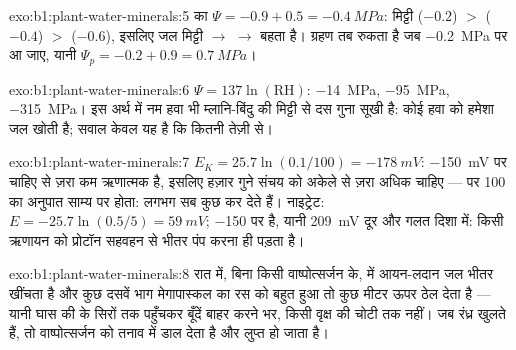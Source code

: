 \begin{solution}{exo:b1:plant-water-minerals:5}
 का $\Psi = -0.9 + 0.5 = \qty{-0.4}{MPa}$: मिट्टी ($-0.2$) $>$ 
($-0.4$) $>$  ($-0.6$), इसलिए जल मिट्टी $\to$  $\to$
 बहता है। ग्रहण तब रुकता है जब  \qty{-0.2}{MPa} पर आ जाए, यानी
$\Psi_p = -0.2 + 0.9 = \qty{0.7}{MPa}$।
\end{solution}

\begin{solution}{exo:b1:plant-water-minerals:6}
$\Psi = 137\ln(\text{RH})$: \qty{-14}{MPa}, \qty{-95}{MPa},
\qty{-315}{MPa}। इस अर्थ में नम हवा भी म्लानि-बिंदु की मिट्टी से दस गुना
सूखी है: कोई  हवा को हमेशा जल खोती है; सवाल केवल यह है कि
कितनी तेज़ी से।
\end{solution}

\begin{solution}{exo:b1:plant-water-minerals:7}
$E_K = 25.7\ln(0.1/100) = \qty{-178}{mV}$: \qty{-150}{mV} पर 
चाहिए से ज़रा कम ऋणात्मक है, इसलिए हज़ार गुने संचय को
अकेले  से ज़रा अधिक चाहिए --- पर 100 का अनुपात
साम्य पर होता:  लगभग सब कुछ कर देते हैं। नाइट्रेट: $E = -25.7\ln(0.5/5)
= \qty{+59}{mV}$;  \qty{-150}{} पर है, यानी \qty{209}{mV} दूर और
गलत दिशा में: किसी ऋणायन को प्रोटॉन सहवहन से भीतर पंप करना ही पड़ता है।
\end{solution}

\begin{solution}{exo:b1:plant-water-minerals:8}
रात में, बिना किसी वाष्पोत्सर्जन के,  में आयन-लदान
जल भीतर खींचता है और कुछ दसवें भाग मेगापास्कल का 
रस को बहुत हुआ तो कुछ मीटर ऊपर ठेल देता है --- यानी घास की  के
सिरों तक पहुँचकर बूँदें बाहर करने भर, किसी वृक्ष की चोटी तक नहीं। जब
रंध्र खुलते हैं, तो वाष्पोत्सर्जन  को तनाव में डाल देता है और  लुप्त हो जाता है।
\end{solution}


